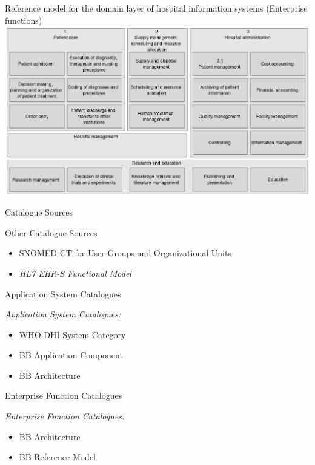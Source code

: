 \documentclass[aspectratio=1610,12pt]{beamer}
\begin{document}
\begin{frame}{Reference model for the domain layer of hospital information systems (Enterprise functions)}
  \centering
  \vspace{-0.3cm}
  \includegraphics[width=.95\textwidth]{img/rmdl.png}
\end{frame}

\begin{frame}{Catalogue Sources}
\begin{spacing}{1.5}
  Other Catalogue Sources
  \begin{itemize}
    \item SNOMED CT for User Groups and Organizational Units
    \item \emph{HL7 EHR-S Functional Model}
  \end{itemize}
\end{spacing}
\end{frame}

\begin{frame}{Application System Catalogues}
\begin{spacing}{1.5}
  \emph{Application System Catalogues:}
  \begin{itemize}
    \item WHO-DHI System Category
    \item BB Application Component
    \item BB Architecture
  \end{itemize}
\end{spacing}
\end{frame}

\begin{frame}{Enterprise Function Catalogues}
\begin{spacing}{1.5}
  \emph{Enterprise Function Catalogues:}
  \begin{itemize}
    \item BB Architecture
    \item BB Reference Model
  \end{itemize}
  \end{spacing}
\end{frame}
\end{document}
